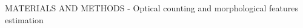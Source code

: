 \documentclass[handout]{beamer}
\newcommand\Fontable{\fontsize{9}{10}\selectfont}
\begin{document}
\begin{frame}{MATERIALS AND METHODS - Optical counting and morphological features estimation}
%	

\end{frame}
\end{document}
